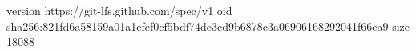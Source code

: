 version https://git-lfs.github.com/spec/v1
oid sha256:821fd6a58159a01a1efef0cf5bdf74de3cd9b6878c3a06906168292041f66ea9
size 18088
